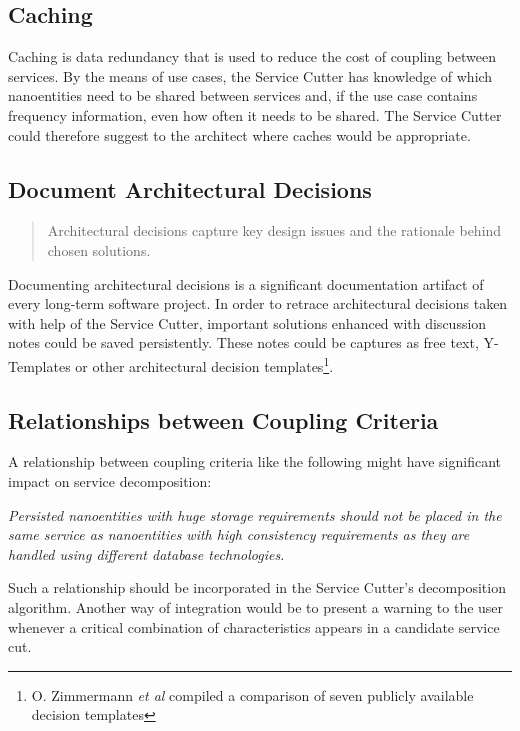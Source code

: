 \subsection{Caching}

Caching is data redundancy that is used to reduce the cost of coupling between services. By the means of use cases, the Service Cutter has knowledge of which nanoentities need to be shared between services and, if the use case contains frequency information, even how often it needs to be shared. The Service Cutter could therefore suggest to the architect where caches would be appropriate.

\subsection{Document Architectural Decisions}

\begin{quote}
	Architectural decisions capture key design issues and the rationale behind chosen solutions.\cite{zioAD}
\end{quote}

Documenting architectural decisions is a significant documentation artifact of every long-term software project. In order to retrace architectural decisions taken with help of the Service Cutter, important solutions enhanced with discussion notes could be saved persistently. These notes could be captures as free text, Y-Templates\cite{zimmermann2012yTemplate} or other architectural decision templates\footnote{O. Zimmermann \textit{et al} compiled a comparison of seven publicly available decision templates\cite[p. 3]{zimmermann2015architectural}}.

\subsection{Relationships between Coupling Criteria}

A relationship between coupling criteria like the following might have significant impact on service decomposition:

\textit{Persisted nanoentities with huge storage requirements should not be placed in the same service as nanoentities with high consistency requirements as they are handled using different database technologies.}

Such a relationship should be incorporated in the Service Cutter's decomposition algorithm. Another way of integration would be to present a warning to the user whenever a critical combination of characteristics appears in a candidate service cut.


